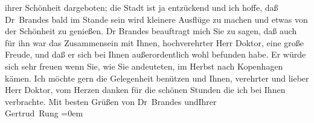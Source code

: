 \begin{ledgroupsized}[t]{13cm}
               ihrer Schönheit dargeboten; die Stadt ist ja entzückend und ich hoffe, daß Dr Brandes bald im Stande sein wird kleinere
               Ausflüge zu machen und etwas von der Schönheit zu genießen.\pend
           \pstart
           Dr Brandes beauftragt mich Sie {\pb}zu
               sagen, daß auch für ihn war das Zusammensein mit Ihnen, hochverehrter Herr Doktor,
               eine große Freude, und daß er sich bei Ihnen außerordentlich wohl befunden habe. Er
               würde sich sehr freuen wenn Sie, wie Sie andeuteten, im Herbst nach Kopenhagen kämen.\pend
           \pstart
           Ich möchte gern die Gelegenheit benützen und Ihnen, verehrter und lieber Herr Doktor,
               vom Herzen danken für die schönen Stunden die ich bei Ihnen verbrachte.\pend
           \pstart
           Mit besten Grüßen von Dr Brandes
                  und\hspace*{2.5em}Ihrer{\\[\baselineskip]}\spacefill\mbox{Gertrud Rung}\pend
           \leftskip=0em{}
         
         \endnumbering{}\end{ledgroupsized}  \newcommand{\dateiname}{L02441}\newcommand{\titel}{Gertrud Rung an Arthur Schnitzler, 24. 5. 1925}\newcommand{\editorInnen}{Martin Anton Müller und Gerd-Hermann Susen}
      